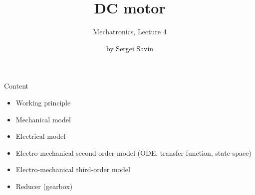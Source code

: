 \documentclass{beamer}
\title{DC motor}
\subtitle{Mechatronics, Lecture 4}
\author{by Sergei Savin}
\date{\mydate}
\begin{document}
\maketitle



\begin{frame}{Content}
\begin{itemize}
\item Working principle
\item Mechanical model
\item Electrical model
\item Electro-mechanical second-order model (ODE, transfer function, state-space)
\item Electro-mechanical third-order model
\item Reducer (gearbox)
\end{itemize}
\end{frame}
\end{document}
